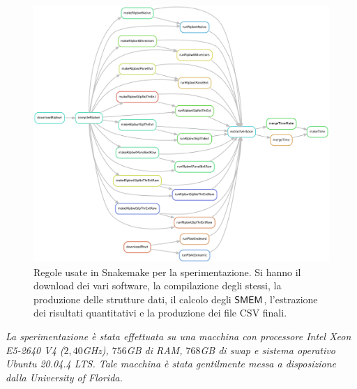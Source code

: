 \begin{figure}
  \centering
  \includegraphics[width=\textwidth]{img/final_dag_r.pdf}
  \caption{Regole usate in Snakemake per la sperimentazione. Si hanno
  il download  dei vari software, la compilazione degli stessi, la produzione
  delle strutture dati,
  il calcolo degli $\mbox{\rm {\sf SMEM}}$, l'estrazione dei risultati
  quantitativi e la produzione dei file CSV finali.}
  \label{fig:snake}
\end{figure}
\newline
\textit{La sperimentazione è stata effettuata su una macchina con processore
  Intel Xeon E5-2640 V4 ($2,40$GHz), $756$GB di RAM, $768$GB di swap e
  sistema operativo Ubuntu 20.04.4 LTS. Tale macchina è stata gentilmente messa
  a disposizione dalla \emph{University of Florida}.}